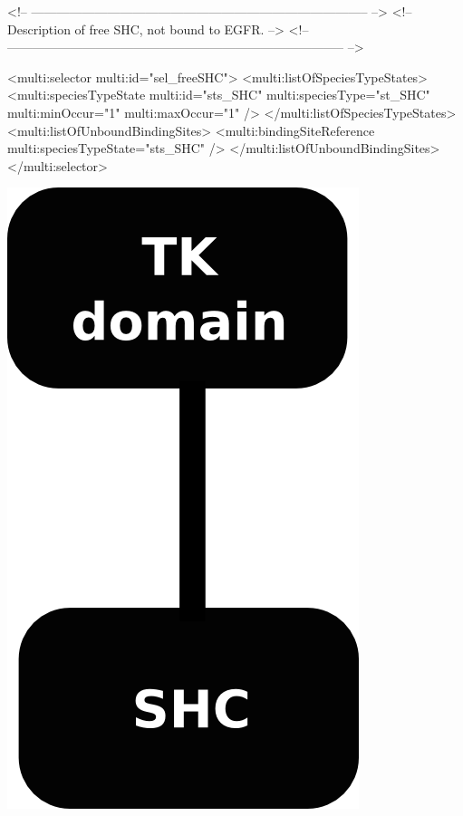 \begin{example}
<!-- -------------------------------------------------------------------------------- -->
<!-- Description of free SHC, not bound to EGFR.                                      -->
<!-- -------------------------------------------------------------------------------- -->

      <multi:selector multi:id="sel_freeSHC">
        <multi:listOfSpeciesTypeStates>
          <multi:speciesTypeState multi:id="sts_SHC" multi:speciesType="st_SHC" 
                                   multi:minOccur="1" multi:maxOccur="1" />
        </multi:listOfSpeciesTypeStates>
        <multi:listOfUnboundBindingSites>
          <multi:bindingSiteReference multi:speciesTypeState="sts_SHC" />
        </multi:listOfUnboundBindingSites>
      </multi:selector>
\end{example}

\includegraphics{figs/pngs/sel_SHC_Signal.png}


